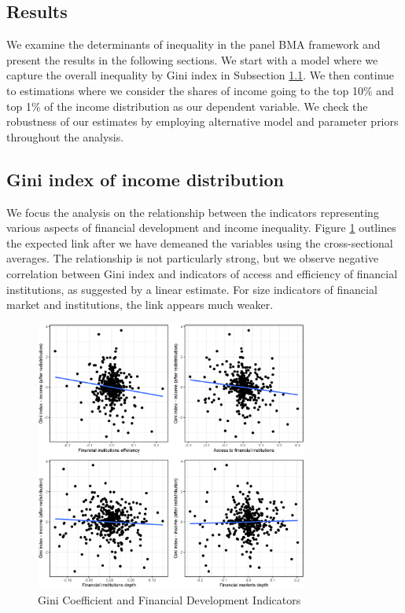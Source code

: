 \begin{refsection}
\section{Results}
\label{ch4sec:results}
We examine the determinants of inequality in the panel \ac{BMA} framework and present the results in the following sections. We start with a model where we capture the overall inequality by Gini index in Subsection \ref{ch4subsec:gini}. We then continue to estimations where we consider the shares of income going to the top 10\% and top 1\% of the income distribution as our dependent variable. We check the robustness of our estimates by employing alternative model and parameter priors throughout the analysis.

\subsection{Gini index of income distribution}\label{ch4subsec:gini}
We focus the analysis on the relationship between the indicators representing various aspects of financial development and income inequality. Figure \ref{ch4fig:gini_findev_dm} outlines the expected link after we have demeaned the variables using the cross-sectional averages. The relationship is not particularly strong, but we observe negative correlation between Gini index and indicators of access and efficiency of financial institutions, as suggested by a linear estimate. For size indicators of financial market and institutions, the link appears much weaker.

\begin{figure}[ht!]
  \caption{Gini Coefficient and Financial Development Indicators}
  \label{ch4fig:gini_findev_dm}
  \centering
  \includegraphics[width=0.8\textwidth, keepaspectratio]{figures/ch4/plots_findev_gini_dm}
\end{figure}


\end{refsection}
